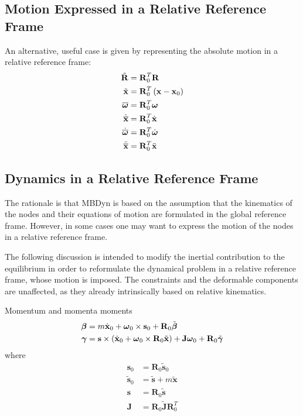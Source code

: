 \documentclass[10pt,dvips,fleqn,subeqn]{report}
\newcommand{\T}[1]{\bm{\mathbf{#1}}}
\newcommand{\TT}[1]{\bm{\mathbf{#1}}}
\begin{document}
\subsection{Motion Expressed in a Relative Reference Frame}
\label{sec:nodes:structural nodes:relative frame motion}
An alternative, useful case is given by representing the absolute motion
in a relative reference frame:
\begin{subequations}
\begin{align}
	\tilde{\TT{R}} &= \TT{R}_0^T \TT{R} \\
	\tilde{\T{x}} &= \TT{R}_0^T\plbr{\T{x} - \T{x}_0} \\
	\overline{\T{\omega}} &= \TT{R}_0^T \T{\omega} \\
	\dot{\overline{\T{x}}} &= \TT{R}_0^T \dot{\T{x}} \\
	\dot{\overline{\T{\omega}}} &= \TT{R}_0^T \dot{\T{\omega}} \\
	\ddot{\overline{\T{x}}} &= \TT{R}_0^T \ddot{\T{x}}
\end{align}
\end{subequations}


\subsection{Dynamics in a Relative Reference Frame}
\label{sec:nodes:structural nodes:relative frame dynamics}
The rationale is that MBDyn is based on the assumption
that the kinematics of the nodes and their equations of motion
are formulated in the global reference frame.
However, in some cases one may want to express the motion
of the nodes in a relative reference frame.

The following discussion is intended to modify the inertial contribution
to the equilibrium in order to reformulate the dynamical problem
in a relative reference frame, whose motion is imposed.
The constraints and the deformable components are unaffected,
as they already intrinsically based on relative kinematics.

Momentum and momenta moments
\begin{subequations}
\begin{align}
	\T{\beta}
	&= m \dot{\T{x}}_0
	+ \T{\omega}_0 \times \T{s}_0
	+ \TT{R}_0 \tilde{\T{\beta}} \\
	\T{\gamma}
	&= \T{s}\times\plbr{
		\dot{\T{x}}_0
		+ \T{\omega}_0 \times \TT{R}_0 \tilde{\T{x}}
	} + \TT{J} \T{\omega}_0
	+ \TT{R}_0 \tilde{\T{\gamma}}
\end{align}
\end{subequations}
where
\begin{align}
	\T{s}_0 &= \TT{R}_0 \tilde{\T{s}}_0 \\
	\tilde{\T{s}}_0 &= \tilde{\T{s}} + m \tilde{\T{x}} \\
	\T{s} &= \TT{R}_0 \tilde{\T{s}} \\
	\TT{J} &= \TT{R}_0 \tilde{\TT{J}} \TT{R}_0^T
\end{align}
\end{document}

